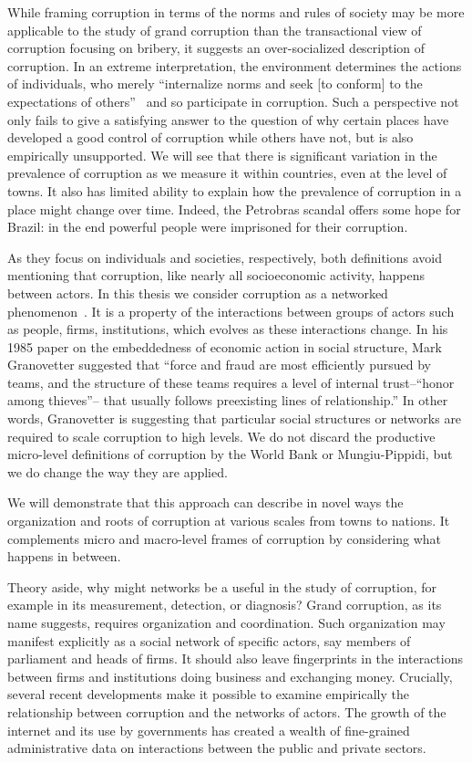 While framing corruption in terms of the norms and rules of society may be more applicable to the study of grand corruption than the transactional view of corruption focusing on bribery, it suggests an over-socialized description of corruption. In an extreme interpretation, the environment determines the actions of individuals, who merely ``internalize norms and seek [to conform] to the expectations of others''~\cite{wrong1961oversocialized} and so participate in corruption. Such a perspective not only fails to give a satisfying answer to the question of why certain places have developed a good control of corruption while others have not, but is also empirically unsupported. We will see that there is significant variation in the prevalence of corruption as we measure it within countries, even at the level of towns. It also has limited ability to explain how the prevalence of corruption in a place might change over time. Indeed, the Petrobras scandal offers some hope for Brazil: in the end powerful people were imprisoned for their corruption.

As they focus on individuals and societies, respectively, both definitions avoid mentioning that corruption, like nearly all socioeconomic activity, happens between actors. In this thesis we consider corruption as a networked phenomenon~\cite{granovetter1985economic}. It is a property of the interactions between groups of actors such as people, firms, institutions, which evolves as these interactions change. In his 1985 paper on the embeddedness of economic action in social structure, Mark Granovetter suggested that ``force and fraud are most efficiently pursued by teams, and the structure of these teams requires a level of internal trust--``honor among thieves''-- that usually follows preexisting lines of relationship.'' In other words, Granovetter is suggesting that particular social structures or networks are required to scale corruption to high levels. We do not discard the productive micro-level definitions of corruption by the World Bank or Mungiu-Pippidi, but we do change the way they are applied.


We will demonstrate that this approach can describe in novel ways the organization and roots of corruption at various scales from towns to nations. It complements micro and macro-level frames of corruption by considering what happens in between.

Theory aside, why might networks be a useful in the study of corruption, for example in its measurement, detection, or diagnosis? Grand corruption, as its name suggests, requires organization and coordination. Such organization may manifest explicitly as a social network of specific actors, say members of parliament and heads of firms. It should also leave fingerprints in the interactions between firms and institutions doing business and exchanging money. Crucially, several recent developments make it possible to examine empirically the relationship between corruption and the networks of actors. The growth of the internet and its use by governments has created a wealth of fine-grained administrative data on interactions between the public and private sectors. 

